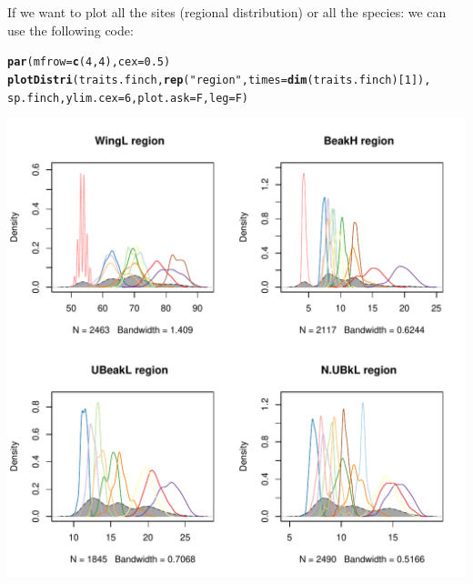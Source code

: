 \documentclass[12pt]{article}\usepackage[]{graphicx}\usepackage[]{color}
\makeatletter
\def\maxwidth{ %
  \ifdim\Gin@nat@width>\linewidth
    \linewidth
  \else
    \Gin@nat@width
  \fi
}
\newcommand{\hlnum}[1]{\textcolor[rgb]{0.686,0.059,0.569}{#1}}%
\newcommand{\hlstr}[1]{\textcolor[rgb]{0.192,0.494,0.8}{#1}}%
\newcommand{\hlstd}[1]{\textcolor[rgb]{0.345,0.345,0.345}{#1}}%
\newcommand{\hlkwc}[1]{\textcolor[rgb]{0.333,0.667,0.333}{#1}}%
\newcommand{\hlkwd}[1]{\textcolor[rgb]{0.737,0.353,0.396}{\textbf{#1}}}%
\newenvironment{kframe}{%
 \def\at@end@of@kframe{}%
 \ifinner\ifhmode%
  \def\at@end@of@kframe{\end{minipage}}%
  \begin{minipage}{\columnwidth}%
 \fi\fi%
 \def\FrameCommand##1{\hskip\@totalleftmargin \hskip-\fboxsep
 \colorbox{shadecolor}{##1}\hskip-\fboxsep
     \hskip-\linewidth \hskip-\@totalleftmargin \hskip\columnwidth}%
 \MakeFramed {\advance\hsize-\width
   \@totalleftmargin\z@ \linewidth\hsize
   \@setminipage}}%
 {\par\unskip\endMakeFramed%
 \at@end@of@kframe}
\newenvironment{knitrout}{}{} %
\makeatother
\begin{document}
If we want to plot all the sites (regional distribution) or all the species: we can use the following code:
\begin{knitrout}
\color{fgcolor}\begin{kframe}
\begin{alltt}
\hlkwd{par}\hlstd{(}\hlkwc{mfrow} \hlstd{=} \hlkwd{c}\hlstd{(}\hlnum{4}\hlstd{,}\hlnum{4}\hlstd{),} \hlkwc{cex} \hlstd{=} \hlnum{0.5}\hlstd{)}
\hlkwd{plotDistri}\hlstd{(traits.finch,} \hlkwd{rep}\hlstd{(}\hlstr{"region"}\hlstd{,} \hlkwc{times} \hlstd{=} \hlkwd{dim}\hlstd{(traits.finch)[}\hlnum{1}\hlstd{]),}
           \hlstd{sp.finch,} \hlkwc{ylim.cex} \hlstd{=} \hlnum{6}\hlstd{,} \hlkwc{plot.ask} \hlstd{= F,} \hlkwc{leg} \hlstd{= F)}
\end{alltt}
\end{kframe}
\includegraphics[width=\maxwidth]{figure/unnamed-chunk-13-1} 

\end{knitrout}
\end{document}

